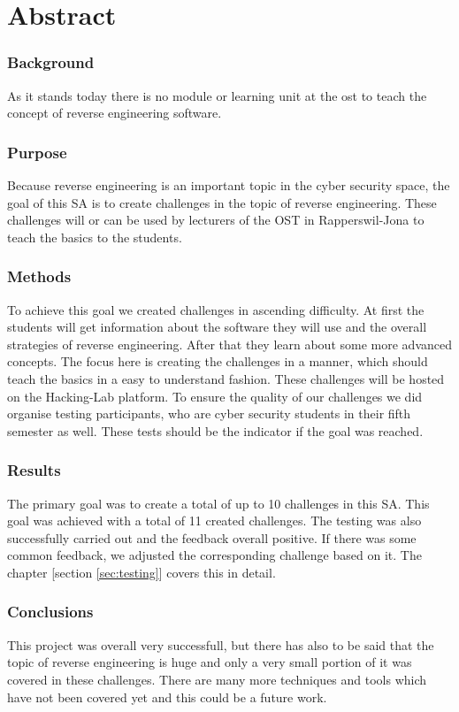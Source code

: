 \chapter{Abstract}
\subsection{Background}
As it stands today there is no module or learning unit at the ost to teach the concept of reverse engineering software.

\subsection{Purpose}
Because reverse engineering is an important topic in the cyber security space, the goal of this SA is to create challenges in the topic of reverse engineering. These challenges will or can be used by lecturers of the OST in Rapperswil-Jona to teach the basics to the students.

\subsection{Methods}
To achieve this goal we created challenges in ascending difficulty. At first the students will get information about the software they will use and the overall strategies of reverse engineering. After that they learn about some more advanced concepts. The focus here is creating the challenges in a manner, which should teach the basics in a easy to understand fashion. These challenges will be hosted on the Hacking-Lab platform. To ensure the quality of our challenges we did organise testing participants, who are cyber security students in their fifth semester as well. These tests should be the indicator if the goal was reached.

\subsection{Results}
The primary goal was to create a total of up to 10 challenges in this SA. This goal was achieved with a total of 11 created challenges. The testing was also successfully carried out and the feedback overall positive. If there was some common feedback, we adjusted the corresponding challenge based on it. The chapter [section \ref{sec:testing}] covers this in detail.

\subsection{Conclusions}
This project was overall very successfull, but there has also to be said that the topic of reverse engineering is huge and only a very small portion of it was covered in these challenges. There are many more techniques and tools which have not been covered yet and this could be a future work.

